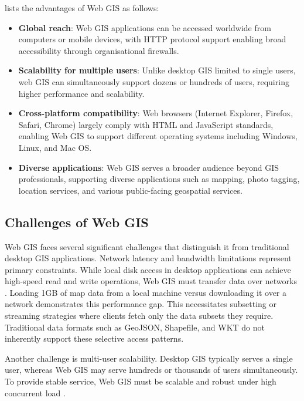 \citet{esri_webgis} lists the advantages of Web GIS as follows:

\begin{itemize}
  \item \textbf{Global reach}: Web GIS applications can be accessed worldwide from computers or mobile devices, with HTTP protocol support enabling broad accessibility through organisational firewalls.
  \item \textbf{Scalability for multiple users}: Unlike desktop GIS limited to single users, web GIS can simultaneously support dozens or hundreds of users, requiring higher performance and scalability.
  \item \textbf{Cross-platform compatibility}: Web browsers (Internet Explorer, Firefox, Safari, Chrome) largely comply with HTML and JavaScript standards, enabling Web GIS to support different operating systems including Windows, Linux, and Mac OS.
  \item \textbf{Diverse applications}: Web GIS serves a broader audience beyond GIS professionals, supporting diverse applications such as mapping, photo tagging, location services, and various public-facing geospatial services.
\end{itemize}

\subsection{Challenges of Web GIS}
\label{tb:challenges_of_webgis}

Web GIS faces several significant challenges that distinguish it from traditional desktop GIS applications. Network latency and bandwidth limitations represent primary constraints. While local disk access in desktop applications can achieve high-speed read and write operations, Web GIS must transfer data over networks \citep{alesheikh_2002}. Loading 1GB of map data from a local machine versus downloading it over a network demonstrates this performance gap. This necessitates subsetting or streaming strategies where clients fetch only the data subsets they require. Traditional data formats such as GeoJSON, Shapefile, and WKT do not inherently support these selective access patterns.

Another challenge is multi-user scalability. Desktop GIS typically serves a single user, whereas Web GIS may serve hundreds or thousands of users simultaneously. To provide stable service, Web GIS must be scalable and robust under high concurrent load \citep{esri_webgis}.

